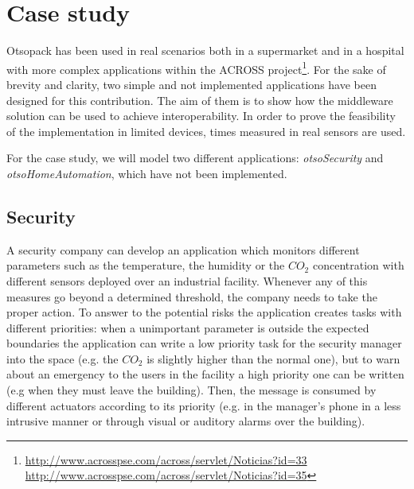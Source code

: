 
% 
% 
\section{Case study}

Otsopack has been used in real scenarios both in a supermarket and in a hospital with more complex applications within
the ACROSS project\footnote{\url{http://www.acrosspse.com/across/servlet/Noticias?id=33}\linebreak
\url{http://www.acrosspse.com/across/servlet/Noticias?id=35}}. For the sake of brevity and clarity, two simple and not
implemented applications have been designed for this contribution. The aim of them is to show how the middleware
solution can be used to achieve interoperability. In order to prove the feasibility of the implementation in limited
devices, times measured in real sensors are used.

For the case study, we will model two different applications: \textit{otsoSecurity} and \textit{otsoHomeAutomation},
which have not been implemented.

\subsection{Security}

A security company can develop an application which monitors different parameters such as the temperature, the humidity
or the $CO_2$ concentration with different sensors deployed over an industrial facility. Whenever any of this measures
go
beyond a determined threshold, the company needs to take the proper action. To answer to the potential risks the
application
creates tasks with different priorities: when a unimportant parameter is outside the expected boundaries the application
can write a low priority task for the security manager into the space (e.g. the $CO_2$ is slightly higher than the
normal one),
but to warn about an emergency to the users in the facility a high priority one can be written (e.g when they must leave
the building). Then, the message is consumed by different actuators according to its priority (e.g. in the manager's
phone in a less intrusive manner or through visual or auditory alarms over the building).

